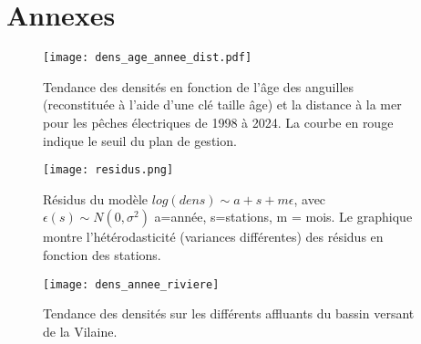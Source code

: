 \documentclass[10pt,twocolumn,titlepage,twoside]{article}\usepackage[]{graphicx}\usepackage[]{xcolor}
\begin{document}
\section{Annexes}
\small

\normalsize
\begin{figure}[htbp]
\centering
\texttt{[image: dens\_age\_annee\_dist.pdf]}
\caption[Densité par âge et distance.]{Tendance des
densités en fonction de l'âge des anguilles (reconstituée à l'aide d'une clé
taille âge) et la distance à la mer pour les pêches électriques de 1998 à 2024.
La courbe en rouge indique le seuil du plan de gestion.}
\label{dens_age_annee_dist}
\end{figure}


\begin{figure}[htbp]
\centering
\texttt{[image: residus.png]}
\caption[Tendance des densités modèle]{Résidus du modèle $log(dens) \sim a +s +m
\epsilon$, avec $\epsilon(s) \sim N(0,\sigma^2)$ a=année, s=stations, m = mois.
Le graphique montre l'hétérodasticité (variances différentes) des résidus en
fonction des stations.}
\label{residus}
\end{figure}

\begin{figure}[htbp]
\centering
 \texttt{[image: dens\_annee\_riviere]}
\caption[Tendance des densités par rivières]{Tendance des densités sur les
différents affluants du bassin versant de la Vilaine.}
\label{dens_annee_riviere}
\end{figure}
\end{document}
